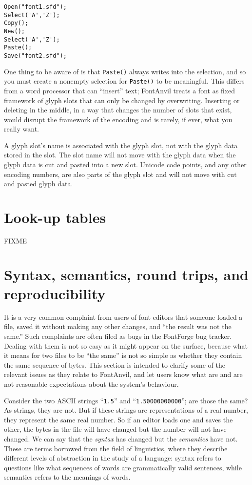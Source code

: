 \begin{verbatim}
Open("font1.sfd");
Select('A','Z');
Copy();
New();
Select('A','Z');
Paste();
Save("font2.sfd");
\end{verbatim}

One thing to be aware of is that \texttt{Paste()} always writes into the
selection, and so you must create a nonempty selection for \texttt{Paste()}
to be meaningful.  This differs from a word processor that can ``insert''
text; FontAnvil treats a font as fixed framework of glyph slots that can
only be changed by overwriting.  Inserting or deleting in the middle, in a
way that changes the number of slots that exist, would disrupt the framework
of the encoding and is rarely, if ever, what you really want.

\begin{framed}
A glyph slot's name is associated with the glyph slot, not with the glyph
data stored in the slot.  The slot name will not move with the glyph data
when the glyph data is cut and pasted into a new slot.  Unicode code points,
and any other encoding numbers, are also parts of the glyph slot and will
not move with cut and pasted glyph data.
\end{framed}

\section{Look-up tables}

FIXME

\section{Syntax, semantics, round trips, and reproducibility}

It is a very common complaint from users of font editors that someone loaded
a file, saved it without making any other changes, and ``the result was not
the same.''  Such complaints are often filed as bugs in the FontForge bug
tracker.  Dealing with them is not so easy as it might appear on the
surface, because what it means for two files to be ``the same'' is not so
simple as whether they contain the same sequence of bytes.  This section is
intended to clarify some of the relevant issues as they relate to FontAnvil,
and let users know what are and are not reasonable expectations about the
system's behaviour.

Consider the two ASCII strings ``\texttt{1.5}'' and
``\texttt{1.50000000000}''; are those the same?  As strings, they are not. 
But if these strings are representations of a real number, they represent
the same real number.  So if an editor loads one and saves the other, the
bytes in the file will have changed but the number will not have changed. 
We can say that the \emph{syntax} has changed but the \emph{semantics} have
not.  These are terms borrowed from the field of linguistics, where they
describe different levels of abstraction in the study of a language: syntax
refers to questions like what sequences of words are grammatically valid
sentences, while semantics refers to the meanings of words.

